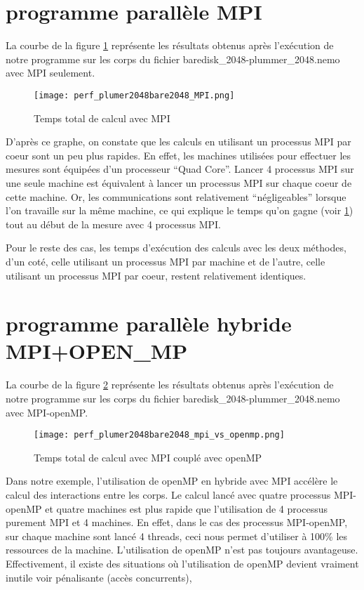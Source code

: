 \section{programme parallèle MPI}

La courbe de la figure \ref{fig:perf_plumer2048bare2048_MPI} représente les résultats obtenus après l'exécution de notre programme sur les corps du fichier baredisk\_2048-plummer\_2048.nemo avec MPI seulement.

\begin{figure}[htbp]
  \centering
  \texttt{[image: perf\_plumer2048bare2048\_MPI.png]}
  \caption{Temps total de calcul avec MPI}
  \label{fig:perf_plumer2048bare2048_MPI}
\end{figure}


\par D'après ce graphe, on constate que les calculs en utilisant un processus MPI par coeur sont un peu plus rapides. En effet, les machines utilisées pour effectuer les mesures sont équipées d'un processeur ``Quad Core''. Lancer 4 processus MPI sur une seule machine est équivalent à lancer un processus MPI sur chaque coeur de cette machine. Or, les communications sont relativement ``négligeables'' lorsque l'on travaille sur la même machine, ce qui explique le temps qu'on gagne (voir \ref{fig:perf_plumer2048bare2048_MPI}) tout au début de la mesure avec 4 processus MPI.

\par Pour le reste des cas, les temps d'exécution des calculs avec les deux méthodes, d'un coté, celle utilisant un processus MPI par machine et de l'autre, celle utilisant un processus MPI par coeur, restent relativement identiques.

\section{programme parallèle hybride MPI+OPEN\_MP}
La courbe de la figure \ref{fig:perf_plumer2048bare2048_openMP} représente les résultats obtenus après l'exécution de notre programme sur les corps du fichier baredisk\_2048-plummer\_2048.nemo avec MPI-openMP.

\begin{figure}[htbp]
  \centering
  \texttt{[image: perf\_plumer2048bare2048\_mpi\_vs\_openmp.png]}
 \caption{Temps total de calcul avec MPI couplé avec openMP}
\label{fig:perf_plumer2048bare2048_openMP}
\end{figure}


Dans notre exemple, l'utilisation de openMP en hybride avec MPI accélère le calcul des interactions entre les corps. Le calcul lancé avec quatre processus MPI-openMP et quatre machines est plus rapide que l'utilisation de 4 processus purement MPI et 4 machines. En effet, dans le cas des processus MPI-openMP, sur chaque machine sont lancé 4 threads, ceci nous permet d'utiliser à 100\% les ressources de la machine. L'utilisation de openMP n'est pas toujours avantageuse. Effectivement, il existe des situations où l'utilisation de openMP devient vraiment inutile voir pénalisante (accès concurrents),

